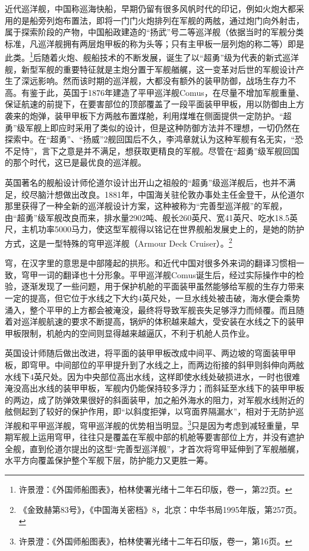 \documentclass[12pt,UTF8]{ctexbook}
\begin{document}
近代巡洋舰，中国称巡海快船，早期仍留有很多风帆时代的印记，例如火炮大都采用的是船旁列炮布置法，即将一门门火炮排列在军舰的两舷，通过炮门向外射击，属于探索阶段的产物，中国船政建造的“扬武”号二等巡洋舰（依据当时的军舰分类标准，凡巡洋舰拥有两层炮甲板的称为头等；只有主甲板一层列炮的称二等）即是此类。\footnote{许景澄：《外国师船图表》，柏林使署光绪十二年石印版，卷一，第22页。}后随着火炮、舰船技术的不断发展，诞生了以“超勇”级为代表的新式巡洋舰，新型军舰的重要特征就是主炮分置于军舰艏艉，这一变革对后世的军舰设计产生了深远影响。然而该时期的巡洋舰，大都没有额外的装甲防御，战场生存力不高。有鉴于此，英国于1876年建造了平甲巡洋舰Comus，在尽量不增加军舰重量、保证航速的前提下，在要害部位的顶部覆盖了一段平面装甲甲板，用以防御由上方袭来的炮弹，装甲甲板下方两舷布置煤舱，利用煤堆在侧面提供一定防护。“超勇”级军舰上即应时采用了类似的设计，但是这种防御方法并不理想，一切仍然在探索中。在“超勇”、“扬威”2舰回国后不久，李鸿章就认为这种军舰有名无实，“恐不足恃”，言下之意是并不满足，想获取更精良的军舰。尽管在“超勇”级军舰回国的那个时代，这已是最优良的巡洋舰。

英国著名的舰船设计师伦道尔设计出开山之祖般的“超勇”级巡洋舰后，也并不满足，绞尽脑汁想做出改良。1881年，中国海关驻伦敦办事处主任金登干，从伦道尔那里获得了一种全新的巡洋舰设计方案，这种被称为“完善型巡洋舰”的军舰，由“超勇”级军舰改良而来，排水量2902吨、舰长260英尺、宽41英尺、吃水18.5英尺，主机功率5000马力，使这型军舰得以铭记在世界舰船发展史上的，是她的防护方式，这是一型特殊的穹甲巡洋舰（Armour Deck Cruiser）。\footnote{《金致赫第83号》，《中国海关密档》8，北京：中华书局1995年版，第257页。}

穹，在汉字里的意思是中部隆起的拱形。和近代中国对很多外来词的翻译习惯相一致，穹甲一词的翻译也十分形象。平甲巡洋舰Comus诞生后，经过实际操作中的检验，逐渐发现了一些问题，用于保护机舱的平面装甲虽然能够给军舰的生存力带来一定的提高，但它位于水线之下大约4英尺处，一旦水线处被击破，海水便会乘势涌入，整个平甲的上方都会被淹没，最终将导致军舰丧失足够浮力而倾覆。而且随着对巡洋舰航速的要求不断提高，锅炉的体积越来越大，受安装在水线之下的装甲甲板限制，机舱内的空间则显得越来越逼仄，不利于机舱人员作业。

英国设计师随后做出改进，将平面的装甲甲板改成中间平、两边坡的穹面装甲甲板，即穹甲。中间部位的平甲提升到了水线之上，而两边衔接的斜甲则斜伸向两舷水线下4英尺处。因为中央部位高出水线，这样即使水线处破损进水，一时也很难淹没高出水线的装甲甲板，军舰内仍能保持较多浮力；而斜延至水线下的装甲甲板的两边，成了防弹效果很好的斜面装甲，加之船外海水的阻力，对军舰水线附近的舷侧起到了较好的保护作用，即“以斜度拒弹，以穹面界隔漏水”，相对于无防护巡洋舰和平甲巡洋舰，穹甲巡洋舰的优势相当明显。\footnote{许景澄：《外国师船图表》，柏林使署光绪十二年石印版，卷一，第16页。}只是因为考虑到减轻重量，早期军舰上运用穹甲，往往只是覆盖在军舰中部的机舱等要害部位上方，并没有遮护全舰，直到伦道尔提出的这型“完善型巡洋舰”，才首次将穹甲延伸到了军舰艏艉，水平方向覆盖保护整个军舰下层，防护能力又更胜一筹。
\end{document}
